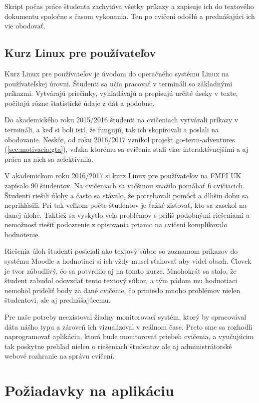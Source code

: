 Skript počas práce študenta zachytáva všetky príkazy a zapisuje ich do textového
dokumentu spoločne s časom vykonania. Ten po cvičení odošlú a prednášajúci ich vie
obodovať.

\subsection{Kurz Linux pre používateľov}
\label{sec:motivacia:linuxforusers}

Kurz Linux pre používateľov je úvodom do operačného systému Linux
na používateľskej úrovni. Študenti sa učia pracovať v termináli so základnými
príkazmi. Vytvárajú priečinky, vyhľadávajú a prepisujú určité úseky v texte,
počítajú rôzne štatistické údaje z dát a podobne.

Do akademického roku 2015/2016 študenti na cvičeniach vytvárali príkazy v
termináli, a keď si boli istí, že fungujú, tak ich skopírovali a poslali na obodovanie.
Neskôr, od roku 2016/2017 vznikol projekt go-term-adventures (\ref{sec:motivacia:gta}), vďaka ktorému sa
cvičenia stali viac interaktívnejšími a aj práca na nich sa zefektívnila.

V akademickom roku 2016/2017 si kurz Linux pre používateľov na FMFI UK zapísalo
90 študentov. Na cvičeniach sa väčšinou snažilo pomáhať 6 cvičiacich. Študenti riešili
úlohy a často sa stávalo, že potrebovali pomôcť a dlhšiu dobu sa neprihlásili.
Pri tak veľkom počte študentov je ťažké zisťovať, kto sa zasekol na danej úlohe.
Taktiež sa vyskytlo veľa problémov s príliš podobnými riešeniami a nemožnosť riešiť podozrenie z opisovania priamo na cvičení komplikovalo hodnotenie.

Riešenia úloh študenti posielali ako textový súbor so zoznamom príkazov do systému
Moodle a hodnotiaci si ich vždy musel sťahovať aby videl obsah. Človek je
tvor zábudlivý, čo sa potvrdilo aj na tomto kurze. Mnohokrát sa stalo, že študent
zabudol odovzdať tento textový súbor, a tým pádom mu hodnotiaci nemohol prideliť
body za dané cvičenie, čo prinieslo mnoho problémov nielen študentovi, ale aj
prednášajúcemu.

Pre naše potreby neexistoval žiadny monitorovací systém, ktorý by spracovával
dáta nášho typu a zároveň ich vizualizoval v reálnom čase. 
Preto sme sa rozhodli naprogramovať aplikáciu, ktorá bude
monitorovať priebeh cvičenia, a vyučujúcim tak poskytne prehľad nielen o riešeniach
študentov ale aj administrátorské webové rozhranie na správu cvičení.

\section{Požiadavky na aplikáciu}
\label{sec:apprequirements}

